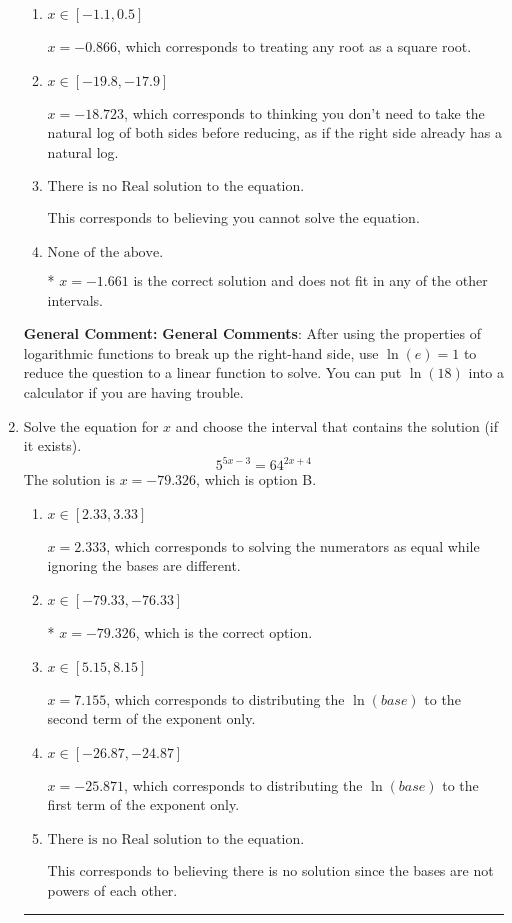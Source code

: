 \documentclass{extbook}[14pt]
\newcommand{\litem}[1]{\item #1

\rule{\textwidth}{0.4pt}}
\begin{document}
\begin{enumerate}
{\begin{enumerate}[label=\Alph*.]
$x = 1.661$, which is the negative of the correct solution.
\item \( x \in [-1.1, 0.5] \)

$x = -0.866$, which corresponds to treating any root as a square root.
\item \( x \in [-19.8, -17.9] \)

$x = -18.723$, which corresponds to thinking you don't need to take the natural log of both sides before reducing, as if the right side already has a natural log.
\item \( \text{There is no Real solution to the equation.} \)

This corresponds to believing you cannot solve the equation.
\item \( \text{None of the above.} \)

* $x = -1.661$ is the correct solution and does not fit in any of the other intervals.
\end{enumerate}

\textbf{General Comment:} \textbf{General Comments}: After using the properties of logarithmic functions to break up the right-hand side, use $\ln(e) = 1$ to reduce the question to a linear function to solve. You can put $\ln(18)$ into a calculator if you are having trouble.
}
\litem{
Solve the equation for $x$ and choose the interval that contains the solution (if it exists).
\[ 5^{5x-3} = 64^{2x+4} \]The solution is \( x = -79.326 \), which is option B.\begin{enumerate}[label=\Alph*.]
\item \( x \in [2.33, 3.33] \)

$x = 2.333$, which corresponds to solving the numerators as equal while ignoring the bases are different.
\item \( x \in [-79.33, -76.33] \)

* $x = -79.326$, which is the correct option.
\item \( x \in [5.15, 8.15] \)

$x = 7.155$, which corresponds to distributing the $\ln(base)$ to the second term of the exponent only.
\item \( x \in [-26.87, -24.87] \)

$x = -25.871$, which corresponds to distributing the $\ln(base)$ to the first term of the exponent only.
\item \( \text{There is no Real solution to the equation.} \)

This corresponds to believing there is no solution since the bases are not powers of each other.
\end{enumerate}

}
\end{enumerate}
\end{document}
